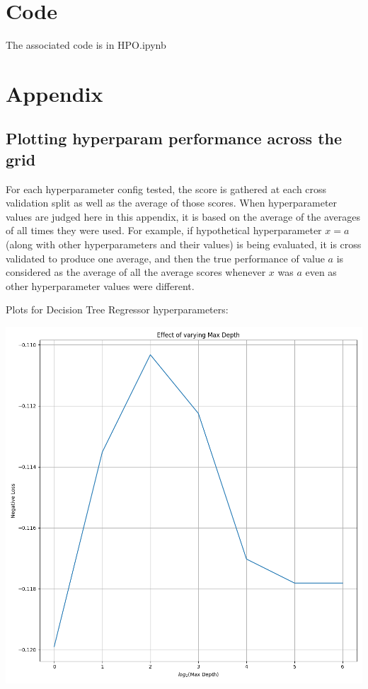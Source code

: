 \documentclass[12pt, letterpaper]{article}
\begin{document}
\section{Code} %

The associated code is in HPO.ipynb

\section{Appendix}
\subsection{Plotting hyperparam performance across the grid}

For each hyperparameter config tested, the score is gathered at each cross validation split as well as the average of those scores. When hyperparameter values are judged here in this appendix, it is based on the average of the averages of all times they were used. For example, if hypothetical hyperparameter $x = a$ (along with other hyperparameters and their values) is being evaluated, it is cross validated to produce one average, and then the true performance of value $a$ is considered as the average of all the average scores whenever $x$ was $a$ even as other hyperparameter values were different.

\newcommand{\myscale}{0.4}

Plots for Decision Tree Regressor hyperparameters:

\includegraphics[scale=\myscale]{decision_tree_regressor_Max Depth.png}
\end{document}
